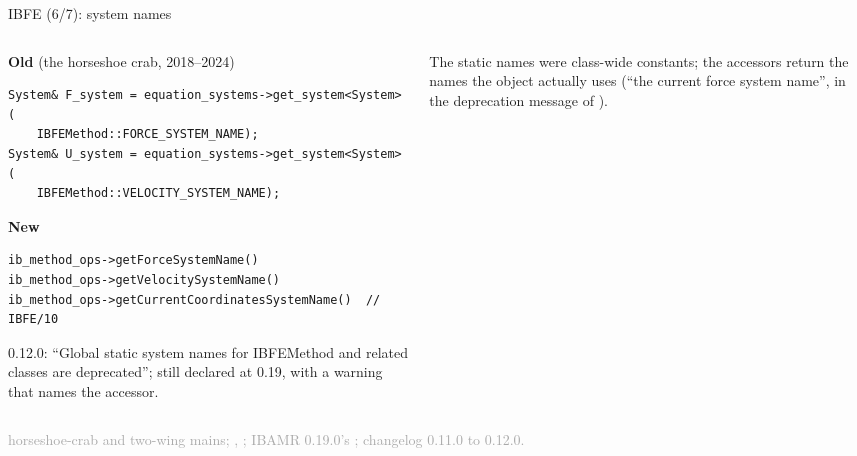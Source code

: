 \documentclass[aspectratio=169,11pt]{beamer}
\newcommand{\sourcecredit}[1]{\vfill\begin{flushright}\tiny\textcolor{DarkGray}{#1}\end{flushright}}
\begin{document}
\begin{frame}[fragile]{IBFE (6/7): system names}
\label{fr:sysnames}
\begin{columns}[T,onlytextwidth]
\begin{column}{0.55\textwidth}
\textbf{Old} (the horseshoe crab, 2018--2024)
\begin{lstlisting}[style=cpptiny]
System& F_system = equation_systems->get_system<System>(
    IBFEMethod::FORCE_SYSTEM_NAME);
System& U_system = equation_systems->get_system<System>(
    IBFEMethod::VELOCITY_SYSTEM_NAME);
\end{lstlisting}
\textbf{New}
\begin{lstlisting}[style=cpptiny]
ib_method_ops->getForceSystemName()
ib_method_ops->getVelocitySystemName()
ib_method_ops->getCurrentCoordinatesSystemName()  // IBFE/10
\end{lstlisting}
\footnotesize {} 0.12.0: ``Global static system names for IBFEMethod and related classes are deprecated''; still declared at 0.19, with a warning that names the accessor.
\end{column}
\begin{column}{0.42\textwidth}
\footnotesize
The static names were class-wide constants; the accessors return the names the object actually uses (``the current force system name'', in the deprecation message of ).
\end{column}
\end{columns}
\sourcecredit{ horseshoe-crab and two-wing mains; \code{examples/IBFE/01}, \code{IBFE/10}; IBAMR 0.19.0's \code{FEMechanicsBase.h}; changelog 0.11.0 to 0.12.0.}
\end{frame}
\end{document}

